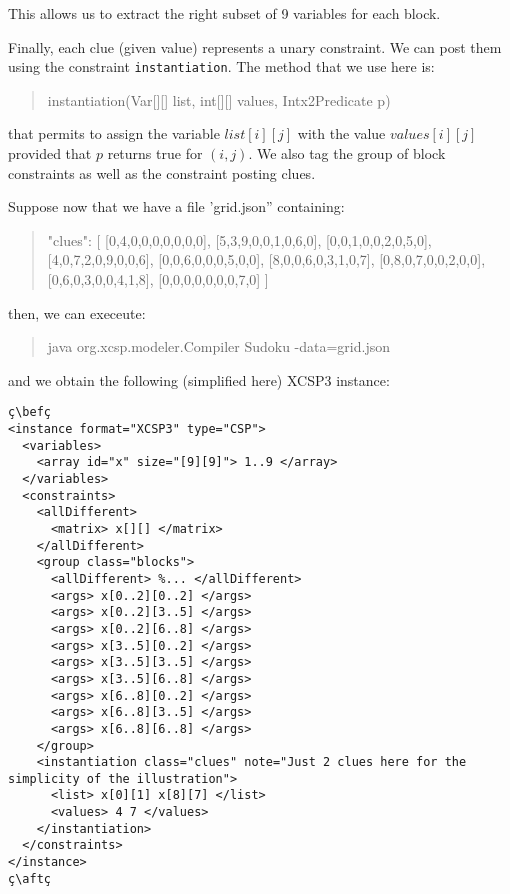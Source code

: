 \documentclass[10pt]{article}
\def\xt{{\rm XCSP3}\xspace}
\newcommand{\gb}[1]{{\tt #1}} %
\def\xt{{\rm XCSP3}\xspace}
\newenvironment{myvb}{\endgraf\small\verbatim}{\endverbatim}
\def\bef{\rule{10cm}{0.1mm}} %
\def\aft{\rule{10cm}{0.1mm}\medskip}
\begin{document}
This allows us to extract the right subset of 9 variables for each block.

Finally, each clue (given value) represents a unary constraint.
We can post them using the constraint \gb{instantiation}.
The method that we use here is:

\begin{quote}
\begin{myvb}
instantiation(Var[][] list, int[][] values, Intx2Predicate p) 
\end{myvb}
\end{quote}
that permits to assign the variable $list[i][j]$ with the value $values[i][j]$ provided that $p$ returns true for $(i,j)$. 
We also tag the group of block constraints as well as the constraint posting clues.


Suppose now that we have a file 'grid.json'' containing:
\begin{quote}
\begin{myvb}
{
  "clues": [
    [0,4,0,0,0,0,0,0,0],
    [5,3,9,0,0,1,0,6,0],
    [0,0,1,0,0,2,0,5,0],
    [4,0,7,2,0,9,0,0,6],
    [0,0,6,0,0,0,5,0,0],
    [8,0,0,6,0,3,1,0,7],
    [0,8,0,7,0,0,2,0,0],
    [0,6,0,3,0,0,4,1,8],
    [0,0,0,0,0,0,0,7,0]
  ]
}
\end{myvb}
\end{quote}
then, we can execeute:
\begin{quote}
\begin{myvb}
java org.xcsp.modeler.Compiler Sudoku -data=grid.json
\end{myvb}
\end{quote}
and we obtain the following (simplified here) \xt instance:
\begin{lstlisting}
ç\befç
<instance format="XCSP3" type="CSP">
  <variables>
    <array id="x" size="[9][9]"> 1..9 </array>
  </variables>
  <constraints>
    <allDifferent>
      <matrix> x[][] </matrix>
    </allDifferent>
    <group class="blocks">
      <allDifferent> %... </allDifferent>
      <args> x[0..2][0..2] </args>
      <args> x[0..2][3..5] </args>
      <args> x[0..2][6..8] </args>
      <args> x[3..5][0..2] </args>
      <args> x[3..5][3..5] </args>
      <args> x[3..5][6..8] </args>
      <args> x[6..8][0..2] </args>
      <args> x[6..8][3..5] </args>
      <args> x[6..8][6..8] </args>
    </group>
    <instantiation class="clues" note="Just 2 clues here for the simplicity of the illustration">
      <list> x[0][1] x[8][7] </list>
      <values> 4 7 </values>
    </instantiation>
  </constraints>
</instance>
ç\aftç
\end{lstlisting}
\end{document}
